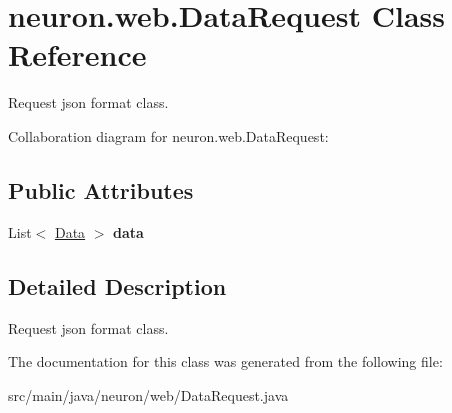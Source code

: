 \hypertarget{classneuron_1_1web_1_1DataRequest}{}\section{neuron.\+web.\+Data\+Request Class Reference}
\label{classneuron_1_1web_1_1DataRequest}


Request json format class.  




Collaboration diagram for neuron.\+web.\+Data\+Request\+:
\subsection*{Public Attributes}
\begin{DoxyCompactItemize}
\item 
\mbox{\label{classneuron_1_1web_1_1DataRequest_a860343bed5e63138c01913637436fc9d}} 
List$<$ \hyperlink{classneuron_1_1entities_1_1Data}{Data} $>$ {\bfseries data}
\end{DoxyCompactItemize}


\subsection{Detailed Description}
Request json format class. 

The documentation for this class was generated from the following file\+:\begin{DoxyCompactItemize}
\item 
src/main/java/neuron/web/Data\+Request.\+java\end{DoxyCompactItemize}

